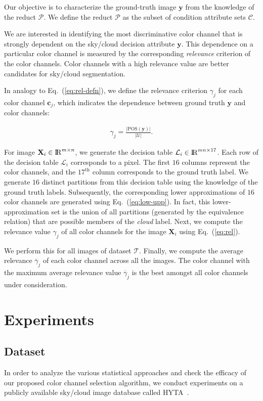 Our objective is to characterize the ground-truth image $\mathbf{y}$ from the knowledge of the reduct $\mathcal{P}$. We define the reduct $\mathcal{P}$ as the subset of condition attribute sets $\mathcal{C}$.

We are interested in identifying the most discriminative color channel that is strongly dependent on the sky/cloud decision attribute $\mathbf{y}$. This dependence on a particular color channel is measured by the corresponding \emph{relevance} criterion of the color channels. Color channels with a high relevance value are better candidates for sky/cloud segmentation.

In analogy to Eq.~(\ref{eq:rel-defn}), we define the relevance criterion $\gamma_j$ for each color channel $\mathbf{c}_j$, which indicates the dependence between ground truth $\mathbf{y}$ and color channels:

\begin{align}
\label{eq:rel}
\gamma_j = \frac{|\mbox{POS}(\mathbf{y})|}{|\mathcal{U}|}.
\end{align}

For image $\mathbf{X}_i \in {\rm I\!R}^{m \times n}$, we generate the decision table $\mathcal{L}_i \in {\rm I\!R}^{mn \times 17}$. Each row of the decision table $\mathcal{L}_i$ corresponds to a pixel. The first $16$ columns represent the color channels, and the $17^\mathrm{th}$ column corresponds to the ground truth label. We generate $16$ distinct partitions from this decision table using the knowledge of the ground truth labels. Subsequently, the corresponding lower approximations of $16$ color channels are generated using Eq.~(\ref{eq:low-upp}). In fact, this lower-approximation set is the union of all partitions (generated by the equivalence relation) that are possible members of the \emph{cloud} label. Next, we compute the relevance value $\gamma_j$ of all color channels for the image $\mathbf{X}_i$ using Eq.~(\ref{eq:rel}). 

We perform this for all images of dataset $\mathcal{T}$. Finally, we compute the average relevance $\overline{\gamma}_j$ of each color channel across all the images. The color channel with the maximum average relevance value $\overline{\gamma}_j$ is the best amongst all color channels under consideration.

\section{Experiments}
\label{sec:chap4-exp}
\subsection{Dataset}
\label{sec:introduceHYTA}
In order to analyze the various statistical approaches and check the efficacy of our proposed color channel selection algorithm, we conduct experiments on a publicly available sky/cloud image database called HYTA~\cite{Li2011}. 

